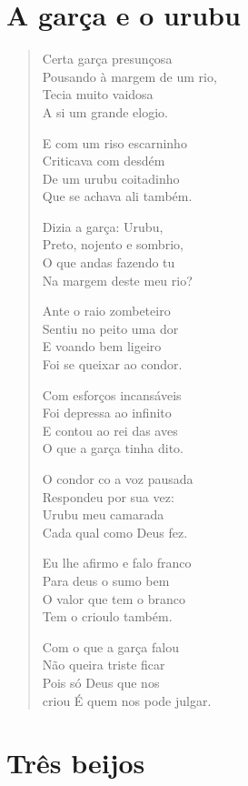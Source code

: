 \chapter{A garça e o urubu}

\begin{verse}
Certa garça presunçosa\\
Pousando à margem de um rio,\\
Tecia muito vaidosa\\
A si um grande elogio.

E com um riso escarninho\\
Criticava com desdém\\
De um urubu coitadinho\\
Que se achava ali também.

Dizia a garça: Urubu,\\
Preto, nojento e sombrio,\\
O que andas fazendo tu\\
Na margem deste meu rio?

Ante o raio zombeteiro\\
Sentiu no peito uma dor\\
E voando bem ligeiro\\
Foi se queixar ao condor.

Com esforços incansáveis\\
Foi depressa ao infinito\\
E contou ao rei das aves\\
O que a garça tinha dito.

O condor co a voz pausada\\
Respondeu por sua vez:\\
Urubu meu camarada\\
Cada qual como Deus fez.

Eu lhe afirmo e falo franco\\
Para deus o sumo bem\\
O valor que tem o branco\\
Tem o crioulo também.

Com o que a garça falou\\
Não queira triste ficar\\
Pois só Deus que nos\\
criou É quem nos pode julgar.
\end{verse}

\chapter{Três beijos}

